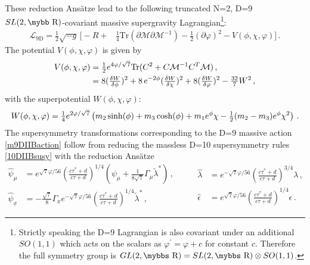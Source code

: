 \documentclass[12pt,a4paper]{article}
\def\bb#1{\hbox{\mybb#1}}
\def\bbs#1{\hbox{\mybbs#1}}
\begin{document}
These reduction Ans\"atze lead to the following truncated N=2, D=9
$SL(2,\bb{R})$-covariant massive supergravity Lagrangian\footnote{
Strictly speaking the D=9 Lagrangian is also covariant under an
additional $SO(1,1)$ which acts on the scalars as $\varphi^\prime
= \varphi + c$ for constant $c$. Therefore the full symmetry group
is $GL(2,\bbs{R}) = SL(2,\bbs{R}) \otimes SO(1,1)$.}:
\begin{align}
  \mathcal{L}_{\text{9D}}
    = \tfrac{1}{2} \sqrt{-{g}} \,
    \bigl [ -{R} +
  & \tfrac{1}{4} \text{Tr}
    (\partial {\mathcal{M}} \partial {\mathcal{M}}^{-1})
    -\tfrac{1}{2} (\partial \varphi)^2 - V(\phi, \chi, \varphi)\bigr ]\, .
\label{m9DIIBaction}
\end{align}
The potential $V(\phi, \chi, \varphi)$ is given by
\begin{equation}
\begin{aligned}
  V(\phi, \chi, \varphi)
  & = \tfrac{1}{2} e^{4 \varphi / \sqrt{7}} \text{Tr}
    ( C^2 +  C \mathcal{M}^{-1} C^T \mathcal{M} ) \,, \\
  & = 8 (\tfrac{\delta W}{\delta \phi})^2
    +8 \, e^{-2\phi} (\tfrac{\delta W}{\delta \chi})^2
    +8 (\tfrac{\delta W}{\delta \varphi})^2
    -{\textstyle{{32\over 7}}} W^2 \, ,
\end{aligned}
\label{pot9B}
\end{equation}
%
with the superpotential $W(\phi, \chi, \varphi)$:
\begin{equation}
    W(\phi, \chi, \varphi) = {\textstyle{1\over 4}} e^{2\varphi/\sqrt{7}}
    \left( m_2 \sinh(\phi) + m_3 \cosh(\phi) + m_1 e^\phi\chi
    - {\textstyle{1\over 2}}(m_2-m_3)e^\phi \chi^2\right )\, .
\label{sp9revisited}
\end{equation}
%
The supersymmetry transformations corresponding to the D=9
massive action \eqref{m9DIIBaction} follow
from reducing the massless D=10 supersymmetry rules \eqref{10DIIBsusy} with the reduction Ans\"atze
\begin{equation}
\begin{aligned}
  \hat{\psi}_\mu & = e^{\sqrt{7} \varphi /56}
    \left( \frac{c \tau^* + d}{c \tau + d} \right)^{1/4}
    (\psi_\mu + \tfrac{1}{8\sqrt{7}} \Gamma_{\mu} \tilde{\lambda}^* )\,, \\
  \hat{\psi}_{\underline{x}} & = - \tfrac{\sqrt{7}}{8} \Gamma_{\underline{x}}
    e^{-\sqrt{7} \varphi /56}
    \left( \frac{c \tau^* + d}{c \tau + d} \right)^{1/4} \tilde{\lambda}^* \,, \qquad
\end{aligned} \qquad
\begin{aligned}
  \hat{\lambda} & = e^{-\sqrt{7} \varphi /56}
    \left( \frac{c \tau^* + d}{c \tau + d} \right)^{3/4} \lambda \,,  \\
  \hat{\epsilon} & = e^{\sqrt{7} \varphi /56}
    \left( \frac{c \tau^* + d}{c \tau + d} \right)^{1/4} \epsilon \,.
\end{aligned}
\label{redf}
\end{equation}
\end{document}
